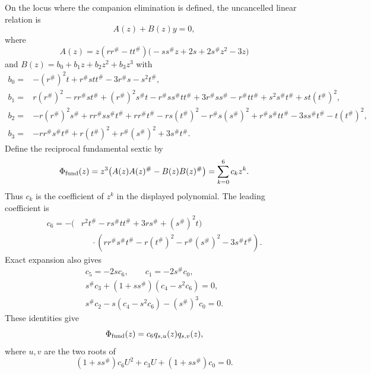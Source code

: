 \documentclass[aps,prx,reprint,nofootinbib,twoside,superscriptaddress,longbibliography,floatfix]{revtex4-2}
\theoremstyle{definition}
\begin{document}
On the locus where the companion elimination is defined, the uncancelled linear relation is
\begin{equation}
A(z)+B(z)y=0,
\label{eq:supp-companion-linear}
\end{equation}
where
\begin{equation}
A(z)=z(rr^\#-tt^\#)
\bigl(-ss^\#z+2s+2s^\#z^2-3z\bigr)
\label{eq:supp-A-explicit}
\end{equation}
and $B(z)=b_0+b_1z+b_2z^2+b_3z^3$ with
\begin{equation}
\begin{aligned}
b_0={}&-(r^\#)^2t+r^\#stt^\#-3r^\#s-s^2t^\#,
\\
b_1={}&r(r^\#)^2-rr^\#st^\#+(r^\#)^2s^\#t
-r^\#ss^\#tt^\#+3r^\#ss^\#-r^\#tt^\#
+s^2s^\#t^\#+st(t^\#)^2,
\\
b_2={}&-r(r^\#)^2s^\#+rr^\#ss^\#t^\#+rr^\#t^\#
-rs(t^\#)^2-r^\#s(s^\#)^2+r^\#s^\#tt^\#
-3ss^\#t^\#-t(t^\#)^2,
\\
b_3={}&-rr^\#s^\#t^\#+r(t^\#)^2+r^\#(s^\#)^2+3s^\#t^\#.
\label{eq:supp-B-explicit}
\end{aligned}
\end{equation}
Define the reciprocal fundamental sextic by
\begin{equation}
\Phi_{\rm fund}(z)=z^3\bigl(A(z)A(z)^\#-B(z)B(z)^\#\bigr)
=\sum_{k=0}^{6}c_kz^k.
\label{eq:supp-fundamental-sextic}
\end{equation}
Thus $c_k$ is the coefficient of $z^k$ in the displayed polynomial.  The leading coefficient is
\begin{equation}
\begin{aligned}
c_6=-(&r^2t^\#-rs^\#tt^\#+3rs^\#+(s^\#)^2t)\\
&\mathrel{\phantom{-}}\cdot
(rr^\#s^\#t^\#-r(t^\#)^2-r^\#(s^\#)^2-3s^\#t^\#).
\end{aligned}
\label{eq:supp-c6-explicit}
\end{equation}
Exact expansion also gives
\begin{equation}
\begin{gathered}
c_5=-2sc_6,\qquad c_1=-2s^\#c_0,\\
s^\#c_3+(1+ss^\#)(c_4-s^2c_6)=0,\\
s^\#c_2-s(c_4-s^2c_6)-(s^\#)^3c_0=0.
\end{gathered}
\label{eq:supp-coefficient-identities}
\end{equation}
These identities give
\begin{equation}
\Phi_{\rm fund}(z)=c_6q_{s,u}(z)q_{s,v}(z),
\label{eq:supp-sextic-factor}
\end{equation}
where $u,v$ are the two roots of
\begin{equation}
(1+ss^\#)c_6U^2+c_3U+(1+ss^\#)c_0=0.
\label{eq:supp-product-quadratic}
\end{equation}
\end{document}
